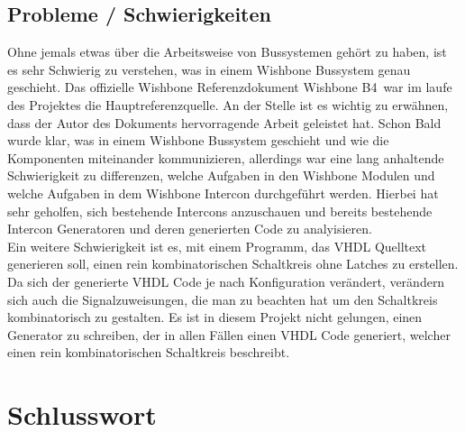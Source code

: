 \documentclass{article}
\begin{document}
\subsection{Probleme / Schwierigkeiten}
Ohne jemals etwas über die Arbeitsweise von Bussystemen gehört zu haben, ist es sehr Schwierig zu verstehen, was in einem Wishbone Bussystem genau geschieht. Das offizielle Wishbone Referenzdokument \glqq Wishbone B4\grqq\ war im laufe des Projektes die Hauptreferenzquelle. An der Stelle ist es wichtig zu erwähnen, dass der Autor des Dokuments hervorragende Arbeit geleistet hat. Schon Bald wurde klar, was in einem Wishbone Bussystem geschieht und wie die Komponenten miteinander kommunizieren, allerdings war eine lang anhaltende Schwierigkeit zu differenzen, welche Aufgaben in den Wishbone Modulen und welche Aufgaben in dem Wishbone Intercon durchgeführt werden. Hierbei hat sehr geholfen, sich bestehende Intercons anzuschauen und bereits bestehende Intercon Generatoren und deren generierten Code zu analyisieren. \\
Ein weitere Schwierigkeit ist es, mit einem Programm, das VHDL Quelltext generieren soll, einen rein kombinatorischen Schaltkreis ohne Latches zu erstellen. Da sich der generierte VHDL Code je nach Konfiguration verändert, verändern sich auch die Signalzuweisungen, die man zu beachten hat um den Schaltkreis kombinatorisch zu gestalten. Es ist in diesem Projekt nicht gelungen, einen Generator zu schreiben, der in allen Fällen einen VHDL Code generiert, welcher einen rein kombinatorischen Schaltkreis beschreibt.
\section{Schlusswort}
\end{document}
